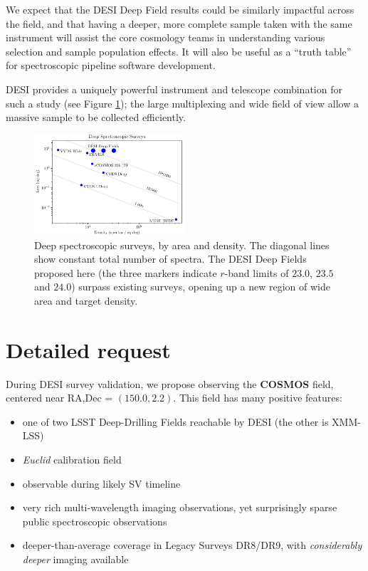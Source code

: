 \documentclass{aastex63}
\begin{document}
We expect that the DESI Deep Field results could be similarly
impactful across the field, and that having a deeper, more complete
sample taken with the same instrument will assist the core cosmology
teams in understanding various selection and sample population
effects.  It will also be useful as a ``truth table'' for
spectroscopic pipeline software development.


DESI provides a uniquely powerful instrument and telescope combination
for such a study (see Figure \ref{fig:surveys}); the large
multiplexing and wide field of view allow a massive sample to be
collected efficiently.

\begin{figure}[h!]
  \begin{center}
    \includegraphics[width=0.5\textwidth]{deep-spec}
  \end{center}
  \caption{Deep spectroscopic surveys, by area and density.  The
    diagonal lines show constant total number of spectra.  The DESI
    Deep Fields proposed here (the three markers indicate $r$-band
    limits of $23.0$, $23.5$ and $24.0$) surpass existing surveys,
    opening up a new region of wide area and target density.
    \label{fig:surveys}}
\end{figure}




\section{Detailed request}

During DESI survey validation, we propose observing the \textbf{COSMOS} field,
centered near RA,Dec = $(150.0, 2.2)$.
This field has many positive features:
\begin{itemize}[noitemsep]
\item one of two LSST Deep-Drilling Fields reachable by DESI (the other is XMM-LSS) 
\item \emph{Euclid} calibration field
\item observable during likely SV timeline
\item very rich multi-wavelength imaging observations, yet
  surprisingly sparse public spectroscopic observations
\item deeper-than-average coverage in Legacy Surveys DR8/DR9, with
  \emph{considerably deeper} imaging available
\end{itemize}
\end{document}
